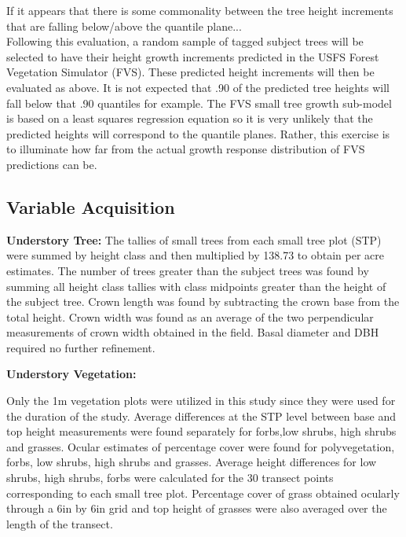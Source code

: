 \documentclass[11pt, letterpaper, fleqn]{article}
\begin{document}
	If it appears that there is some commonality between the tree height increments that are falling below/above the quantile plane...\\[2pt]

Following this evaluation, a random sample of tagged subject trees will be selected to have their height growth increments predicted in the USFS Forest Vegetation Simulator (FVS).  These predicted height increments will then be evaluated as above.  It is not expected that .90 of the predicted tree heights will fall below that .90 quantiles for example. The FVS small tree growth sub-model is based on a least squares regression equation so it is very unlikely that the predicted heights will correspond to the quantile planes.   Rather, this exercise is to illuminate how far from the actual growth response distribution of FVS predictions can be.\\[2pt]

\newpage
\subsection{Variable Acquisition}

\textbf{Understory Tree:}
The tallies of small trees from each small tree plot (STP) were summed by height class and then multiplied by 138.73 to obtain per acre estimates.  The number of trees greater than the subject trees was found by summing all height class tallies with class midpoints greater than the height of the subject tree. Crown length was found by subtracting the crown base from the total height.  Crown width was found as an average of the two perpendicular measurements of crown width obtained in the field. Basal diameter and DBH required no further refinement.

\textbf{Understory Vegetation:}

Only the 1m vegetation plots were utilized in this study since they were used for the duration of the study.  Average differences at the STP level between base and top height measurements were found separately for forbs,low shrubs, high shrubs and grasses.  Ocular estimates of percentage cover were found for polyvegetation, forbs, low shrubs, high shrubs and grasses.  Average height differences for low shrubs, high shrubs, forbs were calculated for the 30 transect points corresponding to each small tree plot.  Percentage cover of grass obtained ocularly through a 6in by 6in grid and top height of grasses were also averaged over the length of the transect.
\end{document}

